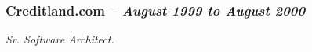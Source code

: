 \documentclass[10pt]{report}
\begin{document}
%
%
%
%
%
%
%
%
%
%
%
%
%
%
%
%
%
%
%

  \subsubsection*{Creditland.com -- \emph{August 1999 to August 2000}}
    \emph{Sr. Software Architect.}
\end{document}
